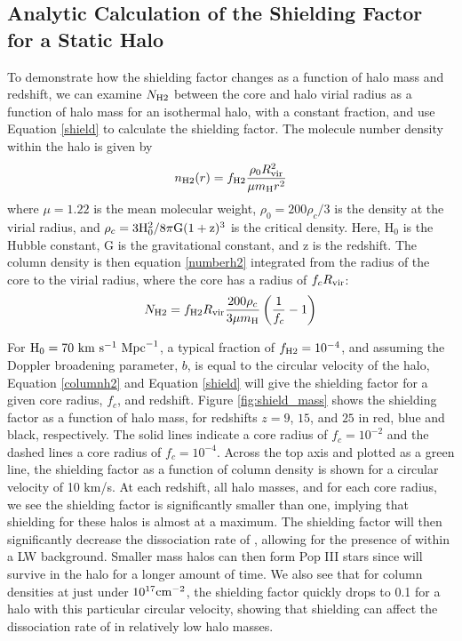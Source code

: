 \documentclass[fleqn,usenatbib]{mnras}
\begin{document}
\subsection{Analytic Calculation of the Shielding Factor for a Static Halo}
To demonstrate how the shielding factor changes as a function of halo mass and redshift, we can examine $N_{\rm H2}$ between the core and halo virial radius as a function of halo mass for an isothermal halo, with a constant \hh{} fraction, and use Equation \ref{shield} to calculate the shielding factor. The \hh{} molecule number density within the halo is given by 
\begin{equation} \label{numberh2}
	n_{\rm H2}(r) = f_{\rm H2} \frac{\rho_{0}R^{2}_{\rm vir}}{\mu m_{\rm H} r^{2}}
\end{equation}
where $\mu = 1.22$ is the mean molecular weight, $\rho_{0} = 200 \rho_{c} / 3$ is the density at the virial radius, and $\rho_{c} = 3 \rm H_{0}^{2} / 8 \pi G (1+z)^3$ is the critical density. Here, H$_{0}$ is the Hubble constant, G is the gravitational constant, and z is the redshift. The column density is then equation \ref{numberh2} integrated from the radius of the core to the virial radius, where the core has a radius of $f_{c} R_{\rm vir}$: 
\begin{equation} \label{columnh2}
	N_{\rm H2} = f_{\rm H2} R_{\rm vir} \frac{200 \rho_{c}}{3 \mu m_{\rm H}} \left(\frac{1}{f_{c}} - 1 \right)
\end{equation}

For $\rm{H}_{0} = 70 \ \rm{km} \ \rm{s}^{-1} \ \rm{Mpc}^{-1}$, a typical \hh{} fraction of $f_{\rm H2} = 10^{-4}$, and assuming the Doppler broadening parameter, $b$, is equal to the circular velocity of the halo, Equation \ref{columnh2} and Equation \ref{shield} will give the shielding factor for a given core radius, $f_{c}$, and redshift. Figure \ref{fig:shield_mass} shows the shielding factor as a function of halo mass, for redshifts $z = 9$, $15$, and $25$ in red, blue and black, respectively. The solid lines indicate a core radius of $f_{c} = 10^{-2}$ and the dashed lines a core radius of $f_{c} = 10^{-4}$. Across the top axis and plotted as a green line, the shielding factor as a function of \hh{} column density is shown for a circular velocity of 10 km/s. At each redshift, all halo masses, and for each core radius, we see the shielding factor is significantly smaller than one, implying that \hh{} shielding for these halos is almost at a maximum. The shielding factor will then significantly decrease the dissociation rate of \hh{}, allowing for the presence of \hh{} within a LW background. Smaller mass halos can then form Pop III stars since \hh{} will survive in the halo for a longer amount of time. We also see that for column densities at just under $10^{17} \rm cm^{-2}$, the shielding factor quickly drops to 0.1 for a halo with this particular circular velocity, showing that \hh{} shielding can affect the dissociation rate of \hh{} in relatively low halo masses.
\end{document}
